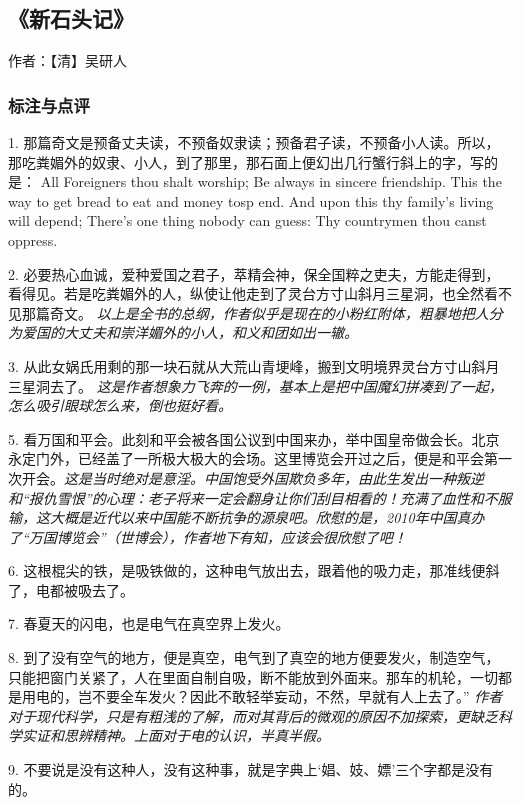 \subsection{《新石头记》}

作者：【清】吴研人

\subsubsection{标注与点评}

1. 那篇奇文是预备丈夫读，不预备奴隶读；预备君子读，不预备小人读。所以，那吃粪媚外的奴隶、小人，到了那里，那石面上便幻出几行蟹行斜上的字，写的是： All Foreigners thou shalt worship; Be always in sincere friendship. This the way to get bread to eat and money tosp end. And upon this thy family's living will depend; There's one thing nobody can guess: Thy countrymen thou canst oppress.

2. 必要热心血诚，爱种爱国之君子，萃精会神，保全国粹之吏夫，方能走得到，看得见。若是吃粪媚外的人，纵使让他走到了灵台方寸山斜月三星洞，也全然看不见那篇奇文。
\emph{以上是全书的总纲，作者似乎是现在的小粉红附体，粗暴地把人分为爱国的大丈夫和崇洋媚外的小人，和义和团如出一辙。}

3. 从此女娲氏用剩的那一块石就从大荒山青埂峰，搬到文明境界灵台方寸山斜月三星洞去了。
\emph{这是作者想象力飞奔的一例，基本上是把中国魔幻拼凑到了一起，怎么吸引眼球怎么来，倒也挺好看。}

5. 看万国和平会。此刻和平会被各国公议到中国来办，举中国皇帝做会长。北京永定门外，已经盖了一所极大极大的会场。这里博览会开过之后，便是和平会第一次开会。\emph{这是当时绝对是意淫。中国饱受外国欺负多年，由此生发出一种叛逆和“报仇雪恨”的心理：老子将来一定会翻身让你们刮目相看的！充满了血性和不服输，这大概是近代以来中国能不断抗争的源泉吧。欣慰的是，2010年中国真办了“万国博览会”（世博会），作者地下有知，应该会很欣慰了吧！}

6. 这根棍尖的铁，是吸铁做的，这种电气放出去，跟着他的吸力走，那准线便斜了，电都被吸去了。

7. 春夏天的闪电，也是电气在真空界上发火。

8. 到了没有空气的地方，便是真空，电气到了真空的地方便要发火，制造空气，只能把窗门关紧了，人在里面自制自吸，断不能放到外面来。那车的机轮，一切都是用电的，岂不要全车发火？因此不敢轻举妄动，不然，早就有人上去了。”
\emph{作者对于现代科学，只是有粗浅的了解，而对其背后的微观的原因不加探索，更缺乏科学实证和思辨精神。上面对于电的认识，半真半假。}

9. 不要说是没有这种人，没有这种事，就是字典上‘娼、妓、嫖’三个字都是没有的。

